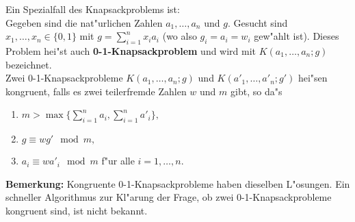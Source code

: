 Ein Spezialfall des Knapsackproblems ist:\\
Gegeben sind die nat"urlichen Zahlen $ a_1, \dots, a_n $   und $ g .$
Gesucht sind  $ x_1, \dots, x_n \in \{ 0,1\} $  mit $ g = \sum_{i=1}^{n}x_i a_i $  (wo also $ g_i = a_i = w_i $ gew"ahlt ist).
Dieses Problem hei"st auch  {\bf 0-1-Knapsackproblem} und wird mit $ K(a_1, \dots, a_n;g) $  bezeichnet.\\

Zwei 0-1-Knapsackprobleme  $ K(a_1, \dots, a_n;g) $   und  $ K(a'_1, \dots, a'_n;g') $  hei"sen kongruent, falls es zwei  teilerfremde Zahlen $ w $ und $ m $ gibt, so da"s
\begin{enumerate}
    \item $ m > \max \{ \sum_{i=1}^n a_i , \sum_{i=1}^n a'_i \}, $

    \item $ g \equiv wg' \mod m, $

    \item $ a_i \equiv w a'_i \mod m $ f"ur alle $ i=1, \dots, n.$

\end{enumerate}
 
{\bf Bemerkung:}
Kongruente 0-1-Knapsackprobleme haben dieselben L"osungen.
Ein schneller Algorithmus zur Kl"arung der Frage, ob zwei 0-1-Knapsackprobleme kongruent sind, ist nicht bekannt.

